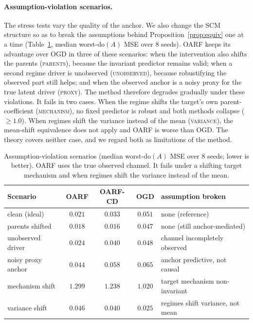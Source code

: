 \documentclass[12pt]{article}
\theoremstyle{plain}
\theoremstyle{remark}
\newcommand{\doop}{\mathrm{do}}
\newcommand{\OARF}{\textsc{OARF}}
\newcommand{\OARFCD}{\textsc{OARF-CD}}
\begin{document}
\paragraph{Assumption-violation scenarios.}
The stress tests vary the quality of the anchor. We also change the SCM structure so as
to break the assumptions behind Proposition~\ref{prop:equiv} one at a time
(Table~\ref{tab:scen}, median worst-$\doop(A)$ MSE over 8 seeds). \OARF{} keeps its
advantage over OGD in three of these scenarios: when the intervention also shifts the
parents (\textsc{parents}), because the invariant predictor remains valid; when a second
regime driver is unobserved (\textsc{unobserved}), because robustifying the observed
part still helps; and when the observed anchor is a noisy proxy for the true latent
driver (\textsc{proxy}). The method therefore degrades gradually under these
violations. It fails in two cases. When the regime shifts the target's own
parent-coefficient (\textsc{mechanism}), no fixed predictor is robust and both methods
collapse ($\ge\!1.0$). When regimes shift the variance instead of the mean
(\textsc{variance}), the mean-shift equivalence does not apply and \OARF{} is worse than
OGD. The theory covers neither case, and we regard both as limitations of the method.

\begin{table}[htbp]
\centering
\caption{Assumption-violation scenarios (median worst-$\doop(A)$ MSE over 8 seeds;
lower is better). \OARF{} uses the true observed channel. It fails under a shifting
target mechanism and when regimes shift the variance instead of the mean.}
\label{tab:scen}
\small
\begin{tabular}{lcccl}
\toprule
Scenario & \OARF{} & \OARFCD{} & OGD & assumption broken\\
\midrule
clean (ideal)      & $0.021$ & $0.033$ & $0.051$ & none (reference)\\
parents shifted    & $0.018$ & $0.016$ & $0.047$ & none (still anchor-mediated)\\
unobserved driver  & $0.024$ & $0.040$ & $0.048$ & channel incompletely observed\\
noisy proxy anchor & $0.044$ & $0.058$ & $0.065$ & anchor predictive, not causal\\
\midrule
mechanism shift    & $1.299$ & $1.238$ & $1.020$ & target mechanism non-invariant\\
variance shift     & $0.046$ & $0.040$ & $0.025$ & regimes shift variance, not mean\\
\bottomrule
\end{tabular}
\end{table}
\end{document}
